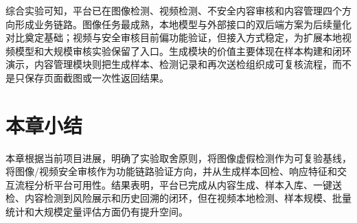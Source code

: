 综合实验可知，平台已在图像检测、视频检测、不安全内容审核和内容管理四个方向形成业务链路。图像任务最成熟，本地模型与外部接口的双后端方案为后续量化对比奠定基础；视频与安全审核目前偏功能验证，但接入方式稳定，为扩展本地视频模型和大规模审核实验保留了入口。生成模块的价值主要体现在样本构建和闭环演示，内容管理模块则把生成样本、检测记录和再次送检组织成可复核流程，而不是只保存页面截图或一次性返回结果。

\section{本章小结}

本章根据当前项目进展，明确了实验取舍原则，将图像虚假检测作为可复验基线，将图像/视频安全审核作为功能链路验证方向，并从生成样本回检、响应特征和交互流程分析平台可用性。结果表明，平台已完成从内容生成、样本入库、一键送检、内容检测到风险展示和历史回溯的闭环，但在视频本地检测、样本规模、批量统计和大规模定量评估方面仍有提升空间。
